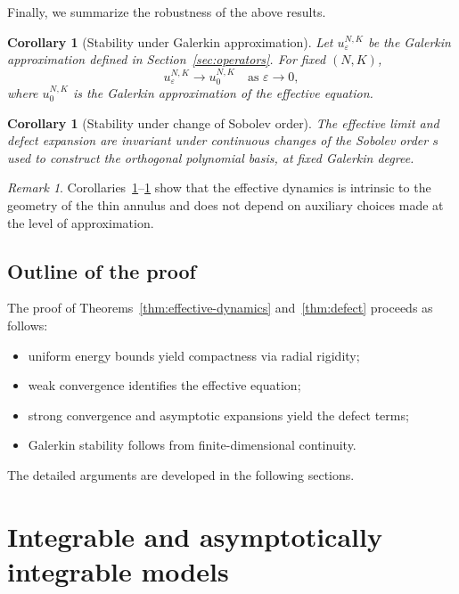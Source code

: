 \documentclass[11pt]{amsart}
\theoremstyle{plain}
\newtheorem{corollary}[theorem]{Corollary}
\theoremstyle{definition}
\theoremstyle{remark}
\newtheorem{remark}[theorem]{Remark}
\theoremstyle{remark}
\begin{document}
Finally, we summarize the robustness of the above results.

\begin{corollary}[Stability under Galerkin approximation]
\label{cor:galerkin}
Let $u_{\varepsilon}^{N,K}$ be the Galerkin approximation defined in
Section~\ref{sec:operators}.
For fixed $(N,K)$,
\[
u_{\varepsilon}^{N,K} \longrightarrow u_0^{N,K}
\quad\text{as }\varepsilon\to0,
\]
where $u_0^{N,K}$ is the Galerkin approximation of the effective equation.
\end{corollary}

\begin{corollary}[Stability under change of Sobolev order]
\label{cor:sobolev-order}
The effective limit and defect expansion are invariant under continuous changes
of the Sobolev order $s$ used to construct the orthogonal polynomial basis, at
fixed Galerkin degree.
\end{corollary}

\begin{remark}
Corollaries~\ref{cor:galerkin}--\ref{cor:sobolev-order} show that the effective
dynamics is intrinsic to the geometry of the thin annulus and does not depend on
auxiliary choices made at the level of approximation.
\end{remark}

\subsection{Outline of the proof}

The proof of Theorems~\ref{thm:effective-dynamics} and~\ref{thm:defect} proceeds
as follows:
\begin{itemize}
\item uniform energy bounds yield compactness via radial rigidity;
\item weak convergence identifies the effective equation;
\item strong convergence and asymptotic expansions yield the defect terms;
\item Galerkin stability follows from finite-dimensional continuity.
\end{itemize}

The detailed arguments are developed in the following sections.

\section{Integrable and asymptotically integrable models}
\label{sec:integrable}
\end{document}
